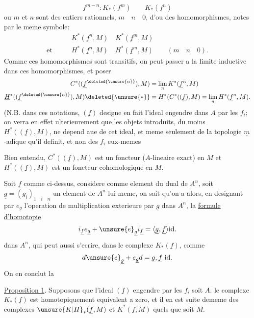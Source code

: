 \[
\underline f^{m-n}: K_{*}(\underline f^{m})\qquad K_{*}(\underline f^{n})
\]
ou $m$ et $n$ sont des entiers rationnels, $m\quad n\quad 0$, d'ou des homomorphismes, notes par le meme symbole:
\[
\begin{aligned}
& K^{*}(\underline f^{n},M)\quad K^{*}(\underline f^{m},M)\\
\text{et}\qquad & H^{*}(\underline f^{n},M)\quad H^{*}(\underline f^{m},M)\qquad (m\quad n\quad 0).
\end{aligned}
\]
Comme ces homomorphismes sont transitifs, on peut passer a la limite inductive dans ces homomorphismes, et poser
\[
\begin{aligned}
C^{*}((\underline f^{\deleted{\unsure{n}}}),M)&=\lim_{n} K^{*}(\underline f^{n},M)\\
\underline H^{*}((\underline f^{\deleted{\unsure{n}}}),M)\deleted{\unsure{*}}&=H^{*}(C^{*}((\underline f),M)=\lim_{n}H^{*}(\underline f^{n},M).
\end{aligned}
\]
(N.B. dans ces notations, $(\underline f)$ designe en fait l'ideal engendre dans $A$ par les $f_i$; on verra en effet ulterieurement que les objets introduits,  du moins $H^{*}((\underline f),M)$, ne depend aue de cet ideal, et meme seulement de la topologie $\underline m$-adique qu'il definit, et non des $f_i$ eux-memes 

Bien entendu, $C^{*}((\underline f),M)$ est un foncteur  ($A$-lineaire exact) en $M$ et $H^{*}((\underline f),M)$ est un foncteur cohomologique en $M$.

Soit $\underline f$ comme ci-dessus,  considere comme element du dual de $A^{n}$, soit $\underline g=(g_i)_{1\quad i\quad n}$ un element de $A^{n}$ lui-meme, on sait qu'on a alors, en designant par $e_{\underline g}$ l'operation de multiplication exterieure par $\underline g$ dans $A^{n}$, la \uline{formule} \uline{d'homotopie}
\[
i_{\underline f}e_{\underline g}+\unsure{e}_{\underline g}i_{\underline f}=\langle\underline g,\underline f\rangle\mathrm{id}.
\]
dans $A^{n}$, qui peut aussi s'ecrire, dans le complexe $K_{*}(\underline f)$, comme
\[
d\unsure{e}_{\underline g}+e_{\underline g}d=\underline g,\underline f\ \mathrm{id}.
\]
On en conclut la

\uline{Proposition 1}. Supposons que l'ideal $(\underline f)$ engendre par les $f_i$ soit $A$.  le complexe $K_{*}(\underline f)$ est homotopiquement equivalent a zero, et il en est  suite dememe des complexes $\unsure{K|H}_{*}(\underline f,M)$ et $K^{*}(\underline f,M)$ quels que soit $M$.


